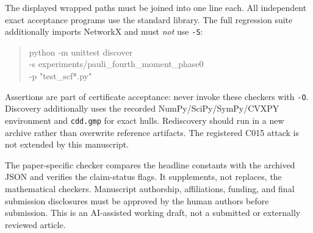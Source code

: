 \documentclass[11pt,a4paper]{article}
\theoremstyle{remark}\newtheorem{remark}[theorem]{Remark}
\begin{document}
The displayed wrapped paths must be joined into one line each. All
independent exact acceptance programs use the standard library. The full
regression suite additionally imports NetworkX and must \emph{not} use
\texttt{-S}:
\begin{quote}\small\ttfamily\raggedright
python -m unittest discover\\
\hspace*{1em}-s experiments/pauli\_fourth\_moment\_phase0\\
\hspace*{1em}-p "test\_scf*.py"
\end{quote}
Assertions are part of certificate acceptance: never invoke these
checkers with \texttt{-O}. Discovery additionally uses the recorded
NumPy/SciPy/SymPy/CVXPY environment and \texttt{cdd.gmp} for exact hulls.
Rediscovery should run in a new archive rather than overwrite reference
artifacts. The registered C015 attack is not extended by this manuscript.

The paper-specific checker compares the headline constants with the
archived JSON and verifies the claim-status flags. It supplements, not
replaces, the mathematical checkers. Manuscript authorship, affiliations,
funding, and final submission disclosures must be approved by the human
authors before submission. This is an AI-assisted working draft, not a
submitted or externally reviewed article.
\end{document}
